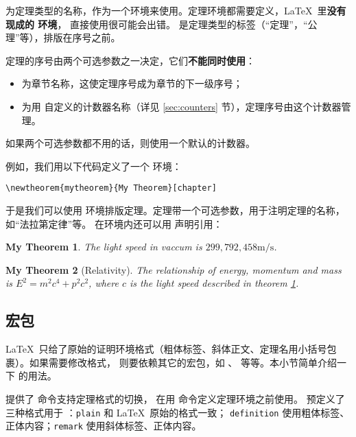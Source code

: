  为定理类型的名称，作为一个环境来使用。定理环境都需要定义，\LaTeX\ 里\textbf{没有现成的  环境}，
直接使用很可能会出错。 是定理类型的标签（“定理”，“公理”等），排版在序号之前。

定理的序号由两个可选参数之一决定，它们\textbf{不能同时使用}：
\begin{itemize}
  \item {} 为章节名称，这使定理序号成为章节的下一级序号；
  \item {} 为用  自定义的计数器名称（详见 \ref{sec:counters} 节），定理序号由这个计数器管理。
\end{itemize}

如果两个可选参数都不用的话，则使用一个默认的计数器。

例如，我们用以下代码定义了一个  环境：
\begin{verbatim}
\newtheorem{mytheorem}{My Theorem}[chapter]
\end{verbatim}
\newtheorem{mytheorem}{My Theorem}[chapter]

于是我们可以使用  环境排版定理。定理带一个可选参数，用于注明定理的名称，如“法拉第定律”等。
在环境内还可以用  声明引用：
\begin{example}
\begin{mytheorem}\label{thm:light}
The light speed in vaccum
is $299,792,458 \mathrm{m/s}$.
\end{mytheorem}
\begin{mytheorem}[Relativity]
The relationship of energy, 
momentum and mass is 
$E^2 = m^2 c^4 + p^2 c^2$,
where $c$ is the light speed 
described in theorem \ref{thm:light}.
\end{mytheorem}
\end{example}

\subsection{ 宏包}

\LaTeX\ 只给了原始的证明环境格式（粗体标签、斜体正文、定理名用小括号包裹）。如果需要修改格式，
则要依赖其它的宏包，如 、 等等。本小节简单介绍一下  的用法。

 提供了  命令支持定理格式的切换，
在用  命令定义定理环境之前使用。
 预定义了三种格式用于 ：\texttt{plain} 和 \LaTeX\ 原始的格式一致；
\texttt{defi\-ni\-tion} 使用粗体标签、正体内容；\texttt{remark} 使用斜体标签、正体内容。

